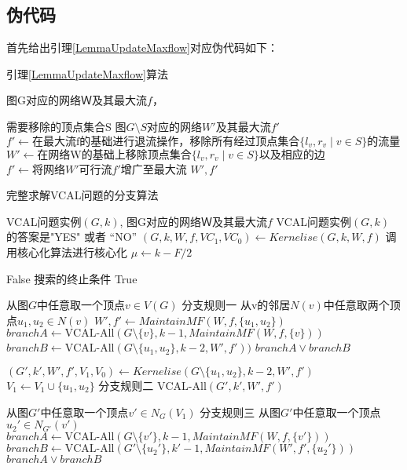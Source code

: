 \subsection{伪代码}
首先给出引理\ref{LemmaUpdateMaxflow}对应伪代码如下：
\begin{algorithm}
\caption{引理\ref{LemmaUpdateMaxflow}算法}
\begin{algorithmic}[1]
\Require 图G对应的网络Ｗ及其最大流$f$，

需要移除的顶点集合S
\Ensure  图$G\setminus S$对应的网络$W'$及其最大流$f'$
    \State $f' \gets \text{在最大流f的基础进行退流操作，移除所有经过顶点集合$\{l_v, r_v\;|\;v \in S\}$的流量}$
    \State $W' \gets \text{在网络W的基础上移除顶点集合$\{l_v, r_v\;|\;v \in S\}$以及相应的边}$
    \State $f' \gets \text{将网络$W'$可行流$f'$增广至最大流}$
    \State \Return $W', f'$
\EndFunction
\end{algorithmic}
\end{algorithm}

\begin{algorithm}
\caption{完整求解VCAL问题的分支算法}
\begin{algorithmic}[1]
\Require VCAL问题实例$(G,k)$, 图G对应的网络Ｗ及其最大流$f$
\Ensure  VCAL问题实例$(G,k)$ 的答案是"YES" 或者 “NO”
    \State $(G, k, W, f, VC_1, VC_0) \gets Kernelise(G, k, W, f)$
    \Comment 调用核心化算法进行核心化
    \State $\mu \gets k - F / 2$

     \Return False \Comment 搜索的终止条件
     \Return True
    \EndIf
    
    \State 从图$G$中任意取一个顶点$v \in V(G)$ \Comment 分支规则一
    \State 从v的邻居$N(v)$中任意取两个顶点$u_1, u_2 \in N(v)$
    \State $W', f' \gets MaintainMF(W, f, \{u_1, u_2\})$
        \State $branchA \gets \text{VCAL-All}(G\setminus\{v\}, k - 1, MaintainMF(W, f, \{v\}))$
        \State $branchB \gets \text{VCAL-All}(G\setminus\{u_1, u_2\}, k - 2, W', f'))$
        \State \Return $branchA \vee branchB$
    \EndIf
    
    \State $(G', k', W', f', V_1, V_0) \gets Kernelise(G\setminus\{u_1, u_2\}, k - 2, W', f')$ 
    \State $V_1 \gets V_1 \cup \{u_1, u_2\}$
     \Comment 分支规则二
        \State \Return $\text{VCAL-All}(G', k', W', f')$
    \EndIf
    
    \State 从图$G'$中任意取一个顶点$v' \in N_G(V_1)$ \Comment 分支规则三
    \State 从图$G'$中任意取一个顶点$u_2' \in N_{G'}(v')$
    \State $branchA \gets \text{VCAL-All}(G\setminus\{v'\}, k - 1, MaintainMF(W, f, \{v'\}))$
    \State $branchB \gets \text{VCAL-All}(G'\setminus\{u_2'\}, k' - 1, MaintainMF(W', f', \{u_2'\}))$
    \State \Return $branchA \vee branchB$
    
\EndFunction
\end{algorithmic}
\end{algorithm} 